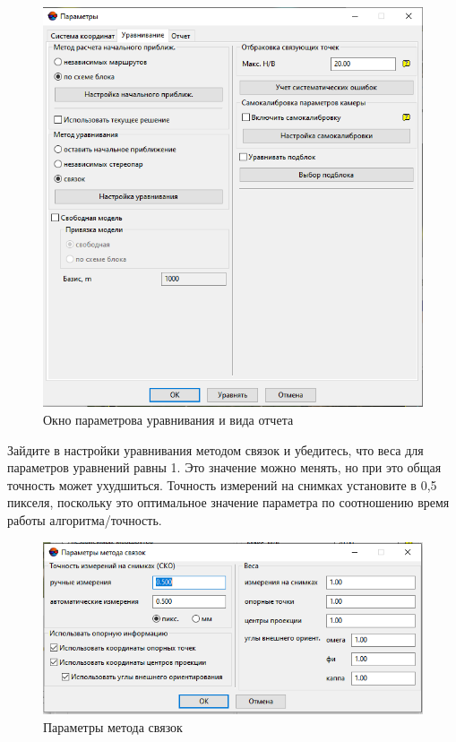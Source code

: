 \documentclass[
  12pt,
]{book}
\begin{document}
\begin{figure}
\centering
\includegraphics{images/Ref15/Adjustment_Settings.png}
\caption{Окно параметрова уравнивания и вида отчета}
\end{figure}

Зайдите в настройки уравнивания методом связок и убедитесь, что веса для параметров уравнений равны 1. Это значение можно менять, но при это общая точность может ухудшиться. Точность измерений на снимках установите в 0,5 пикселя, поскольку это оптимальное значение параметра по соотношению время работы алгоритма/точность.

\begin{figure}
\centering
\includegraphics{images/Ref15/Bundle_Adjustment.png}
\caption{Параметры метода связок}
\end{figure}
\end{document}

